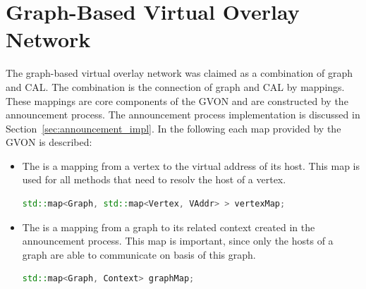 \section{Graph-Based Virtual Overlay Network}
\label{sec:gvon_impl}
The graph-based virtual overlay network was claimed as a combination
of graph and CAL. The combination is the connection of graph and CAL
by mappings. These mappings are core components of the GVON and are
constructed by the announcement process. The announcement process
implementation is discussed in Section~\ref{sec:announcement_impl}. In
the following each map provided by the GVON is described:

\begin{itemize}
\item [] The  is a mapping from a vertex to the virtual
address of its host.  This map is used for all methods
that need to resolv the host of a vertex.

\begin{lstlisting}[language=C++, label=lst:mapping1]
std::map<Graph, std::map<Vertex, VAddr> > vertexMap;
\end{lstlisting}


\item [] The  is a mapping from a graph to its related
context created in the announcement process.  This map is important,
since only the hosts of a graph are able to communicate on basis of
this graph.

\begin{lstlisting}[language=C++, label=lst:mapping2]
std::map<Graph, Context> graphMap;
\end{lstlisting}

\end{itemize}

